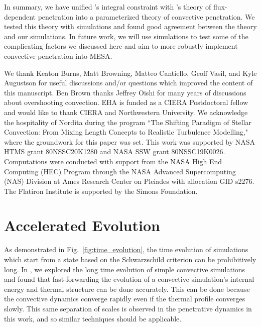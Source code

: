 \documentclass[twocolumn]{aastex631}
\begin{document}
In summary, we have unified \citet{roxburgh1989}'s integral constraint with \citet{zahn1991}'s theory of flux-dependent penetration into a parameterized theory of convective penetration.
We tested this theory with simulations and found good agreement between the theory and our simulations.
In future work, we will use simulations to test some of the complicating factors we discussed here and aim to more robustly implement convective penetration into MESA.



\begin{acknowledgments}
We thank Keaton Burns, Matt Browning, Matteo Cantiello, Geoff Vasil, and Kyle Augustson for useful discussions and/or questions which improved the content of this manuscript.
Ben Brown thanks Jeffrey Oishi for many years of discussions about overshooting convection.
EHA is funded as a CIERA Postdoctoral fellow and would like to thank CIERA and Northwestern University. 
We acknowledge the hospitality of Nordita during the program ``The Shifting Paradigm of Stellar Convection: From Mixing Length Concepts to Realistic Turbulence Modelling," where the groundwork for this paper was set.
This work was supported by NASA HTMS grant 80NSSC20K1280 and NASA SSW grant 80NSSC19K0026.
Computations were conducted with support from the NASA High End Computing (HEC) Program through the NASA Advanced Supercomputing (NAS) Division at Ames Research Center on Pleiades with allocation GID s2276.
The Flatiron Institute is supported by the Simons Foundation.
\end{acknowledgments}


\appendix

\section{Accelerated Evolution}
\label{app:accelerated_evolution}
As demonstrated in Fig.~\ref{fig:time_evolution}, the time evolution of simulations which start from a state based on the Schwarzschild criterion can be prohibitively long.
In \citet{anders_etal_2018}, we explored the long time evolution of simple convective simulations and found that fast-forwarding the evolution of a convective simulation's internal energy and thermal structure can be done accurately.
This can be done because the convective dynamics converge rapidly even if the thermal profile converges slowly.
This same separation of scales is observed in the penetrative dynamics in this work, and so similar techniques should be applicable.
\end{document}
